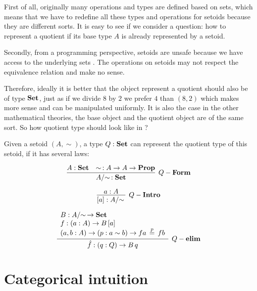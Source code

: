 First of all, originally many operations and types are defined based on
sets, which means that we have to redefine all these types and
operations for setoids because they are different sorts. It is easy to
see if we consider a question: how to represent a quotient if its base
type $A$ is already represented by a setoid. 

Secondly, from a programming perspective, setoids are unsafe because we have access to the underlying
 sets \cite{aan}. The operations on setoids may not respect the
 equivalence relation and make no sense.

Therefore, ideally it is better that the object represent a quotient should also be
of type $\operatorname{\mathbf{Set}}$, just as if we divide $8$ by $2$ we prefer $4$ than
$(8,2)$ which makes more sense and can be manipulated uniformly. It is
also the case in the other mathematical theories, the
base object and the quotient object are of the same sort. So how
quotient type should look like in \itt?

Given a setoid $(A,\sim)$, a type $Q : \operatorname{\mathbf{Set}}$ can represent the quotient
type of this setoid, if it has several laws:



\begin{equation*}
\infer[Q-\bf{Form}]{\qset{A} : \Set}{A : \Set & \sim\, : A \rightarrow A \rightarrow \bf{Prop}}
\end{equation*}

\begin{equation*}
\infer[Q-\bf{Intro}]{[ a ] : \qset{A}}{a : A}
\end{equation*}

\begin{equation*}
\infer[Q-\bf{elim}]{\hat{f} : (q : Q) \rightarrow B \, q}{
\begin{array}{l}
B : \qset{A} \rightarrow  \bf{Set}\\
f : (a : A) \rightarrow B\, [ a ]\\
(a, b : A)  \rightarrow (p : a \sim b)  \rightarrow f a  \, \stackrel{p}{=} \, f b\\
\end{array}}
\end{equation*}
 

\section{Categorical intuition}


